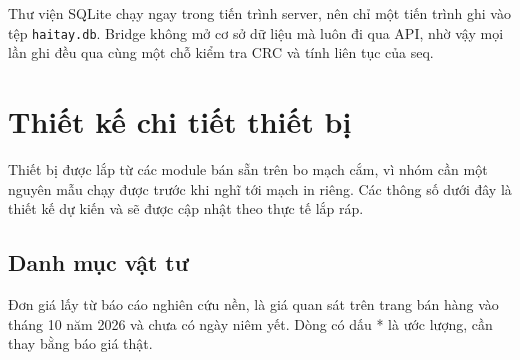 Thư viện SQLite chạy ngay trong tiến trình server, nên chỉ một tiến trình ghi vào tệp \texttt{haitay.db}. Bridge không mở cơ sở dữ liệu mà luôn đi qua API, nhờ vậy mọi lần ghi đều qua cùng một chỗ kiểm tra CRC và tính liên tục của seq.

\section{Thiết kế chi tiết thiết bị}
\label{sec:dev-design}
Thiết bị được lắp từ các module bán sẵn trên bo mạch cắm, vì nhóm cần một nguyên mẫu chạy được trước khi nghĩ tới mạch in riêng. Các thông số dưới đây là thiết kế dự kiến và sẽ được cập nhật theo thực tế lắp ráp.

\subsection{Danh mục vật tư}
Đơn giá lấy từ báo cáo nghiên cứu nền, là giá quan sát trên trang bán hàng vào tháng 10 năm 2026 và chưa có ngày niêm yết. Dòng có dấu * là ước lượng, cần thay bằng báo giá thật.

